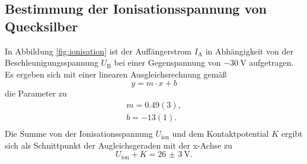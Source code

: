 \subsection{Bestimmung der Ionisationsspannung von Quecksilber}
In Abbildung \ref{fig:ionisation} ist der Auffängerstrom $I_{\mathrm{A}}$ in Abhängigkeit
von der Beschleunigungsspannung $U_{\mathrm{B}}$ bei einer Gegenspannung von $-\SI{30}{\volt}$
aufgetragen.
Es ergeben sich mit einer linearen Ausgleichsrechnung gemäß
\begin{equation*}
	y = m \cdot x + b
\end{equation*}
die Parameter zu
\begin{gather*}
	m = 0.49(3) \mathrm{,} \\
	b = -13(1) \mathrm{.}  \\
\end{gather*}
Die Summe von der Ionisationsspannung $U_{\mathrm{ion}}$ und dem Kontaktpotential $K$ ergibt
sich als Schnittpunkt der Augleichsgeraden mit der x-Achse zu
\begin{equation*}
	U_{\mathrm{ion}} + K = \SI{26(3)}{\volt} \mathrm{.}
\end{equation*}
